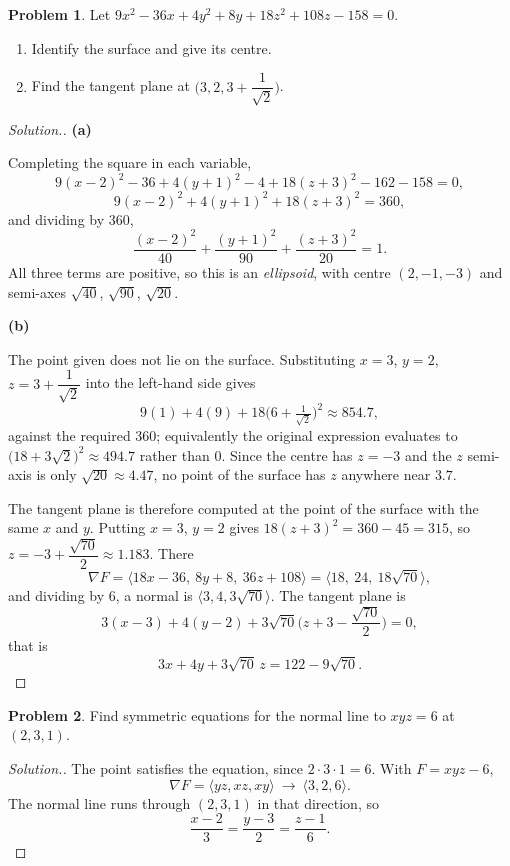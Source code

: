 \documentclass[11pt,a4paper]{article}
\theoremstyle{definition}
\newtheorem{problemx}{Problem}[subsection]
\newenvironment{problem}{\begin{problemx}}{\end{problemx}}
\newenvironment{solution}
  {\renewcommand{\qedsymbol}{}\begin{proof}[\textit{Solution}.]}
  {\end{proof}}
\newcommand{\subhead}[1]{%
  \par\medskip\noindent\textbf{#1}\par\nobreak\smallskip}
\begin{document}
\begin{problem}
Let $9x^2-36x+4y^2+8y+18z^2+108z-158 = 0$.
\begin{enumerate}
\item[(a)] Identify the surface and give its centre.
\item[(b)] Find the tangent plane at
$\Big(3, 2, 3+\dfrac{1}{\sqrt2}\Big)$.
\end{enumerate}
\end{problem}
\begin{solution}
\subhead{(a)}
Completing the square in each variable,
$$9(x-2)^2 - 36 + 4(y+1)^2 - 4 + 18(z+3)^2 - 162 - 158 = 0 ,$$
$$9(x-2)^2 + 4(y+1)^2 + 18(z+3)^2 = 360 ,$$
and dividing by $360$,
$$\frac{(x-2)^2}{40} + \frac{(y+1)^2}{90} + \frac{(z+3)^2}{20} = 1 .$$
All three terms are positive, so this is an \emph{ellipsoid}, with centre
$(2,-1,-3)$ and semi-axes $\sqrt{40}$, $\sqrt{90}$, $\sqrt{20}$.

\subhead{(b)}
The point given does not lie on the surface. Substituting
$x=3$, $y=2$, $z = 3+\dfrac{1}{\sqrt2}$ into the left-hand side gives
$$9(1) + 4(9) + 18\Big(6+\tfrac{1}{\sqrt2}\Big)^2 \approx 854.7 ,$$
against the required $360$; equivalently the original expression evaluates to
$\big(18+3\sqrt2\big)^2\approx 494.7$ rather than $0$. Since the centre has
$z=-3$ and the $z$ semi-axis is only $\sqrt{20}\approx 4.47$, no point of the
surface has $z$ anywhere near $3.7$.

The tangent plane is therefore computed at the point of the surface with the
same $x$ and $y$. Putting $x=3$, $y=2$ gives
$18(z+3)^2 = 360-45 = 315$, so $z = -3+\dfrac{\sqrt{70}}{2}\approx 1.183$.
There
$$\nabla F = \langle 18x-36,\ 8y+8,\ 36z+108\rangle
= \big\langle 18,\ 24,\ 18\sqrt{70}\big\rangle ,$$
and dividing by $6$, a normal is
$\big\langle 3, 4, 3\sqrt{70}\big\rangle$. The tangent plane is
$$3(x-3) + 4(y-2) + 3\sqrt{70}\Big(z+3-\frac{\sqrt{70}}{2}\Big) = 0 ,$$
that is
$$3x + 4y + 3\sqrt{70}\,z = 122 - 9\sqrt{70} .$$
\end{solution}

\begin{problem}
Find symmetric equations for the normal line to $xyz = 6$ at $(2,3,1)$.
\end{problem}
\begin{solution}
The point satisfies the equation, since $2\cdot 3\cdot 1 = 6$. With
$F = xyz-6$,
$$\nabla F = \langle yz, xz, xy\rangle
\ \longrightarrow\ \langle 3, 2, 6\rangle .$$
The normal line runs through $(2,3,1)$ in that direction, so
$$\frac{x-2}{3} = \frac{y-3}{2} = \frac{z-1}{6}.$$
\end{solution}
\end{document}
